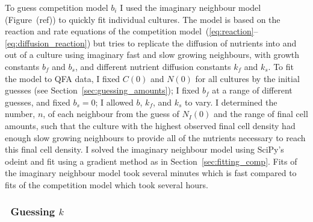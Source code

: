 To guess competition model \(b_{i}\) I used the imaginary neighbour
model (Figure~(ref)) to quickly fit individual cultures. The model is
based on the reaction and rate equations of the competition
model~(\ref{eq:reaction}--\ref{eq:diffusion_reaction}) but tries to
replicate the diffusion of nutrients into and out of a culture using
imaginary fast and slow growing neighbours, with growth constants
\(b_{f}\) and \(b_{s}\), and different nutrient diffusion constants
\(k_{f}\) and \(k_{s}\). To fit the model to QFA data, I fixed
\(C(0)\) and \(N(0)\) for all cultures by the initial guesses (see
Section~\ref{sec:guessing_amounts}); I fixed \(b_{f}\) at a range of
different guesses, and fixed \(b_{s} = 0\); I allowed \(b\),
\(k_{f}\), and \(k_{s}\) to vary. I determined the number, \(n\), of
each neighbour from the guess of \(N_{I}(0)\) and the range of final
cell amounts, such that the culture with the highest observed final
cell density had enough slow growing neighbours to provide all of the
nutrients necessary to reach this final cell density. I solved the
imaginary neighbour model using SciPy's odeint and fit using a
gradient method as in Section~\ref{sec:fitting_comp}. Fits of the
imaginary neighbour model took several minutes which is fast compared
to fits of the competition model which took several hours.


\subsubsection{\boldmath \thesubsubsection~Guessing \({k}\) \unboldmath}

